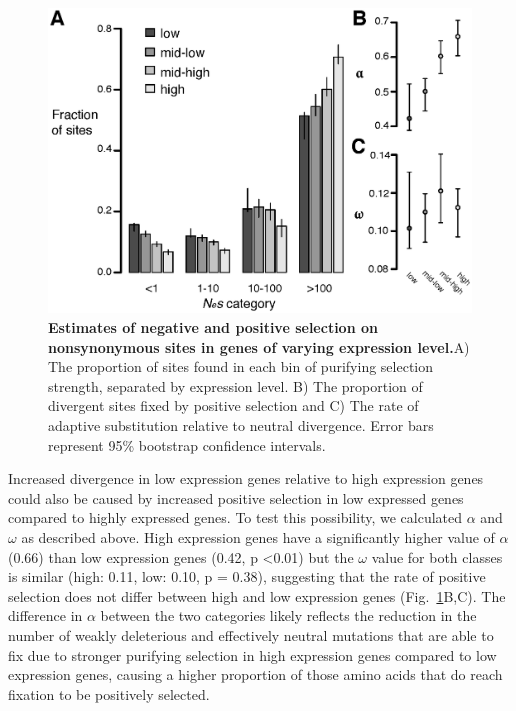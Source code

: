 \begin{figure}[h]
      \centering
       \includegraphics[scale=0.8]{Ch2Fig4}
    \caption{\textbf{Estimates of negative and positive selection on nonsynonymous sites in genes of varying expression level.}A) The proportion of sites found in each bin of purifying selection strength, separated by expression level.  B) The proportion of divergent sites fixed by positive selection and C) The rate of adaptive substitution relative to neutral divergence. Error bars represent 95\% bootstrap confidence intervals. }
    \label{fig:fig4}
\end{figure}

Increased divergence in low expression genes relative to high expression genes could also be caused by increased positive selection in low expressed genes compared to highly expressed genes. To test this possibility, we calculated $\alpha$ and $\omega$ as described above. High expression genes have a significantly higher value of $\alpha$ (0.66) than low expression genes (0.42, p \textless 0.01) but the $\omega$ value for both classes is similar (high: 0.11, low: 0.10, p = 0.38), suggesting that the rate of positive selection does not differ between high and low expression genes (Fig.~\ref{fig:fig4}B,C). The difference in $\alpha$ between the two categories likely reflects the reduction in the number of weakly deleterious and effectively neutral mutations that are able to fix due to stronger purifying selection in high expression genes compared to low expression genes, causing a higher proportion of those amino acids that do reach fixation to be positively selected. 


